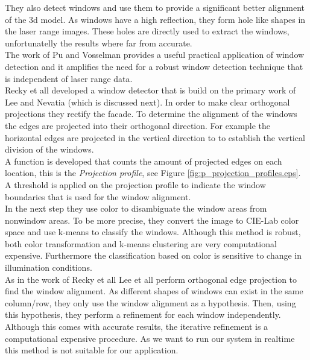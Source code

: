 They also detect windows and use them to provide a significant better alignment
of the 3d model.  As windows have a high reflection, they form hole like shapes
in the laser range images.  These holes are directly used to extract the
windows, unfortunatelly the results where far from accurate.\\

The work of Pu and Vosselman \cite{Pu_refiningbuilding} provides a useful
practical application of window detection and it amplifies the need for a robust
window detection technique that is independent of laser range data.\\


Recky et all \cite{Recky_kmeans} developed a window detector that is build on
the primary work of Lee and Nevatia \cite{Lee_extraction} (which is discussed
next).  In order to make clear orthogonal projections they rectify the facade. 
To determine the alignment of the windows the edges are projected into their orthogonal direction. 
For example the horizontal edges are projected in the vertical direction to 
to establish the vertical division of the windows.\\
A function is developed that counts the amount of projected edges on each
location, this is the \emph{Projection profile}, see Figure
\ref{fig:p_projection_profiles.eps}.
A threshold is applied on the projection profile to indicate the window
boundaries that is used for the window alignment.\\

In the next step they use color to disambiguate the window areas from nonwindow
areas.  To be more precise, they convert the image to CIE-Lab color space and
use k-means to classify the windows.  Although this method is robust, both color
transformation and k-means clustering are very computational expensive.
Furthermore the classification based on color is sensitive to change in
illumination conditions.\\


As in the work of Recky et all \cite{Recky_kmeans} Lee et all
\cite{Lee_extraction}
perform orthogonal edge projection to find the window alignment.  As different
shapes of windows can exist in the same column/row, they only use the window alignment as
a hypothesis.  Then, using this hypothesis, they perform a refinement for each
window independently. 
Although this comes with accurate results, the iterative refinement is
a computational expensive procedure. As we want to run our system in realtime
this method is not suitable for our application. \\

